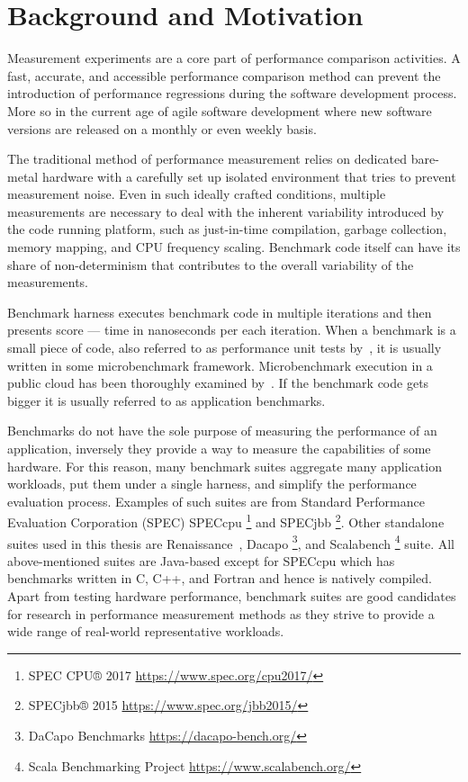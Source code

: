 \chapter{Background and Motivation}
\label{chap:background}


Measurement experiments are a core part of performance comparison activities.
A fast, accurate, and accessible performance comparison method can prevent the introduction of performance regressions during the software development process.
More so in the current age of agile software development where new software versions are released on a monthly or even weekly basis.

The traditional method of performance measurement relies on dedicated bare-metal hardware with a carefully set up isolated environment that tries to prevent measurement noise. 
Even in such ideally crafted conditions, multiple measurements are necessary to deal with the inherent variability introduced by the code running platform, such as just-in-time compilation, garbage collection, memory mapping, and CPU frequency scaling.
Benchmark code itself can have its share of non-determinism that contributes to the overall variability of the measurements.

Benchmark harness executes benchmark code in multiple iterations and then presents score --- time in nanoseconds per each iteration.
When a benchmark is a small piece of code, also referred to as performance unit tests by~\citet{horky2015unit}, it is usually written in some microbenchmark framework.
Microbenchmark execution in a public cloud has been thoroughly examined by~\citet{laaber2019software}.
If the benchmark code gets bigger it is usually referred to as application benchmarks.

Benchmarks do not have the sole purpose of measuring the performance of an application, inversely they provide a way to measure the capabilities of some hardware.
For this reason, many benchmark suites aggregate many application workloads, put them under a single harness, and simplify the performance evaluation process.
Examples of such suites are from Standard Performance Evaluation Corporation (SPEC) SPECcpu \footnote{SPEC CPU® 2017 \url{https://www.spec.org/cpu2017/}} and SPECjbb \footnote{SPECjbb® 2015 \url{https://www.spec.org/jbb2015/}}.
Other standalone suites used in this thesis are Renaissance~\cite{prokopec2019renaissance}, Dacapo \footnote{DaCapo Benchmarks \url{https://dacapo-bench.org/}}, and Scalabench \footnote{Scala Benchmarking Project \url{https://www.scalabench.org/}} suite.
All above-mentioned suites are Java-based except for SPECcpu which has benchmarks written in C, C++, and Fortran and hence is natively compiled.
Apart from testing hardware performance, benchmark suites are good candidates for research in performance measurement methods as they strive to provide a wide range of real-world representative workloads.

